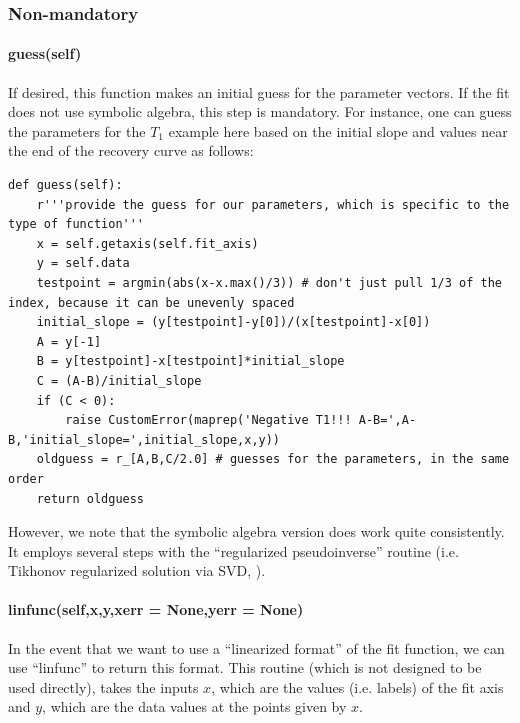 \subsubsection{Non-mandatory}
\paragraph{guess(self)}
If desired, this function makes an initial guess for the
    parameter vectors.
If the fit does not use symbolic algebra, this step is mandatory.
For instance, one can guess the parameters for the $T_1$ example
    here based on the initial slope and values near the end
    of the recovery curve as follows:
\begin{lstlisting}
def guess(self):
    r'''provide the guess for our parameters, which is specific to the type of function'''
    x = self.getaxis(self.fit_axis)
    y = self.data
    testpoint = argmin(abs(x-x.max()/3)) # don't just pull 1/3 of the index, because it can be unevenly spaced
    initial_slope = (y[testpoint]-y[0])/(x[testpoint]-x[0])
    A = y[-1]
    B = y[testpoint]-x[testpoint]*initial_slope
    C = (A-B)/initial_slope
    if (C < 0):
        raise CustomError(maprep('Negative T1!!! A-B=',A-B,'initial_slope=',initial_slope,x,y))
    oldguess = r_[A,B,C/2.0] # guesses for the parameters, in the same order
    return oldguess
\end{lstlisting}

However, we note that the symbolic algebra version does work quite
    consistently.
It employs several steps with the ``regularized pseudoinverse'' routine (i.e. Tikhonov regularized solution via SVD, ).
\paragraph{linfunc(self,x,y,xerr = None,yerr = None)}
In the event that we want to use a ``linearized format'' of the fit function,
    we can use ``linfunc'' to return this format.
This routine (which is not designed to be used directly), 
    takes the inputs $x$, which are the values (i.e. labels)
    of the fit axis and
    $y$, which are the data values at the points given by $x$.

